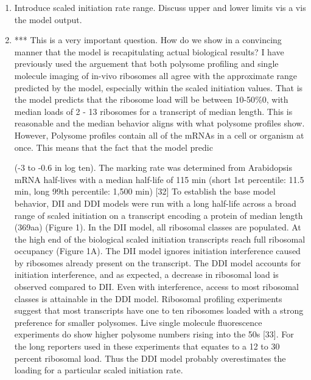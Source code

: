\documentclass[review]{elsarticle}
\begin{document}
\begin{enumerate}

		\item Introduce scaled initiation rate range. Discuss upper and lower limits vis a vis the model output. 
		\item *** This is a very important question. How do we show in a convincing manner that the model is recapitulating actual biological results? I have previously used the arguement that both polysome profiling and single molecule imaging of in-vivo ribosomes all agree with the approximate range predicted by the model, especially within the scaled initiation values. That is the model predicts that the ribosome load will be between 10-50$\%0$, with median loads of 2 - 13 ribosomes for a transcript of median length. This is reasonable and the median behavior aligns with what polysome profiles show. However, Polysome profiles contain all of the mRNAs in a cell or organism at once. This means that the fact that the model predic 

(-3 to -0.6 in log ten). The marking rate was determined from Arabidopsis mRNA half-lives with a median half-life of 115 min (short 1st percentile: 11.5 min, long 99th percentile: 1,500 min) [32]
To establish the base model behavior, DII and DDI models were run with a long half-life across a broad range of scaled initiation on a transcript encoding a protein of median length (369aa) (Figure 1). In the DII model, all ribosomal classes are populated. At the high end of the biological scaled initiation transcripts reach full ribosomal occupancy (Figure 1A). The DII model ignores initiation interference caused by ribosomes already present on the transcript. The DDI model accounts for initiation interference, and as expected, a decrease in ribosomal load is observed compared to DII. Even with interference, access to most ribosomal classes is attainable in the DDI model. Ribosomal profiling experiments suggest that most transcripts have one to ten ribosomes loaded with a strong preference for smaller polysomes. Live single molecule fluorescence experiments do show higher polysome numbers rising into the 50s [33]. For the long reporters used in these experiments that equates to a 12 to 30 percent ribosomal load. Thus the DDI model probably overestimates the loading for a particular scaled initiation rate.
	\end{enumerate}
\end{document}

